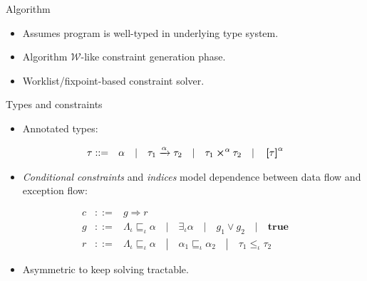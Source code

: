 \documentclass[serif,professionalfont]{beamer}
\renewcommand{\leq}{\leqslant}
\newcommand{\BTrue}{\textbf{true}}
\newcommand{\Sh}{\tau}
\newcommand{\TyFun}[3]{#1 \xrightarrow{#3} #2}
\newcommand{\TyPair}[3]{#1 \bm{\times}^{#3} #2}
\newcommand{\TyList}[2]{\bm{\left[}#1\bm{\right]}^{#2}}
\newcommand{\AnnLat}{\Lambda}
\theoremstyle{plain}
\theoremstyle{definition}
\begin{document}
\begin{frame}{Algorithm}

    \begin{itemize}
    
        \item Assumes program is well-typed in underlying type system.
    
        \item Algorithm $\mathcal{W}$-like constraint generation phase.
        
        \item Worklist/fixpoint-based constraint solver.
    
    \end{itemize}

\end{frame}

\begin{frame}{Types and constraints}

    \begin{itemize}

        \item Annotated types:

    \end{itemize}
    
        \begin{eqnarray*}
        \Sh    &::=& \alpha
               \quad | \quad \TyFun{\Sh_1}{\Sh_2}{\alpha}
               \quad | \quad \TyPair{\Sh_1}{\Sh_2}{\alpha}
               \quad | \quad \TyList{\Sh}{\alpha}
        \end{eqnarray*}

    \begin{itemize}
    
        \item \emph{Conditional constraints} and \emph{indices} model dependence between data flow and exception flow:
           
    \end{itemize}

    \begin{eqnarray*}
    c &::=& g \Rightarrow r                                                   \\
    g &::=& \AnnLat_\iota \sqsubseteq_\iota \alpha
      \quad | \quad \exists_\iota \alpha
      \quad | \quad g_1 \lor g_2
      \quad | \quad \BTrue                                                   \\
    r &::=& \AnnLat_\iota \sqsubseteq_\iota \alpha
      \quad | \quad \alpha_1 \sqsubseteq_\iota \alpha_2
      \quad | \quad \Sh_1 \leq_\iota \Sh_2
    \end{eqnarray*}

    \begin{itemize}
    
        \item Asymmetric to keep solving tractable.
    
    \end{itemize}

\end{frame}
\end{document}
